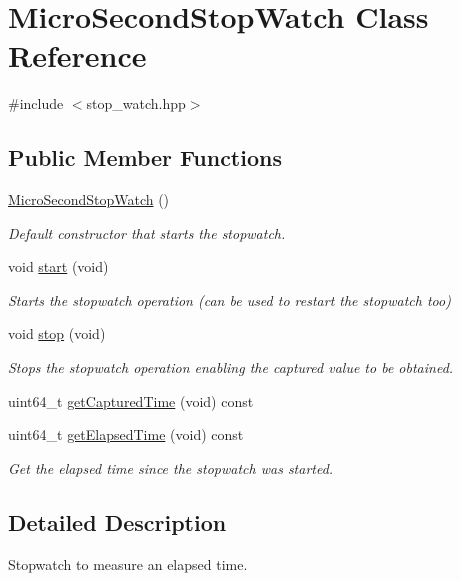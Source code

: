 \hypertarget{classMicroSecondStopWatch}{}\section{Micro\+Second\+Stop\+Watch Class Reference}
\label{classMicroSecondStopWatch}


{\ttfamily \#include $<$stop\+\_\+watch.\+hpp$>$}

\subsection*{Public Member Functions}
\begin{DoxyCompactItemize}
\item 
\hyperlink{classMicroSecondStopWatch_a0349789f3bc1ed8278a86b0bdd6e2c8d}{Micro\+Second\+Stop\+Watch} ()
\begin{DoxyCompactList}\small\item\em Default constructor that starts the stopwatch. \end{DoxyCompactList}\item 
void \hyperlink{classMicroSecondStopWatch_a2376f62d01542ab7ac2add6215c98ec1}{start} (void)
\begin{DoxyCompactList}\small\item\em Starts the stopwatch operation (can be used to restart the stopwatch too) \end{DoxyCompactList}\item 
void \hyperlink{classMicroSecondStopWatch_a98441a3bb1567879ead4da6e7424eff7}{stop} (void)
\begin{DoxyCompactList}\small\item\em Stops the stopwatch operation enabling the captured value to be obtained. \end{DoxyCompactList}\item 
uint64\+\_\+t \hyperlink{classMicroSecondStopWatch_a49742a14a8a48401034ef431a321b071}{get\+Captured\+Time} (void) const 
\item 
uint64\+\_\+t \hyperlink{classMicroSecondStopWatch_a526134ba49ff00249859eedf0736c8c6}{get\+Elapsed\+Time} (void) const 
\begin{DoxyCompactList}\small\item\em Get the elapsed time since the stopwatch was started. \end{DoxyCompactList}\end{DoxyCompactItemize}


\subsection{Detailed Description}
Stopwatch to measure an elapsed time. 

